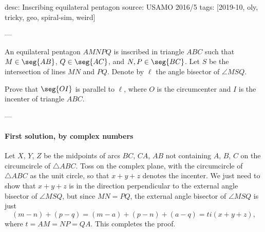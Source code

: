 desc: Inscribing equilateral pentagon
source: USAMO 2016/5
tags: [2019-10, oly, tricky, geo, spiral-sim, weird]

---

An equilateral pentagon $AMNPQ$ is inscribed in triangle $ABC$ such that $M\in\seg{AB}$, $Q\in\seg{AC}$, and $N,P\in\seg{BC}$. Let $S$ be the intersection of lines $MN$ and $PQ$. Denote by $\ell$ the angle bisector of $\angle MSQ$.

Prove that $\seg{OI}$ is parallel to $\ell$, where $O$ is the circumcenter and $I$ is the incenter of triangle $ABC$.

---

\paragraph{First solution, by complex numbers}     Let $X$, $Y$, $Z$ be the midpoints of arcs $BC$, $CA$, $AB$ not containing $A$, $B$, $C$ on the circumcircle of $\triangle ABC$. Toss on the complex plane, with the circumcircle of $\triangle ABC$ as the unit circle, so that $x+y+z$ denotes the incenter. We just need to show that $x+y+z$ is in the direction perpendicular to the external angle bisector of $\angle MSQ$, but since $MN=PQ$, the external angle bisector of $\angle MSQ$ is just \[(m-n)+(p-q)=(m-a)+(p-n)+(a-q)=ti(x+y+z),\]
where $t=AM=NP=QA$. This completes the proof.

